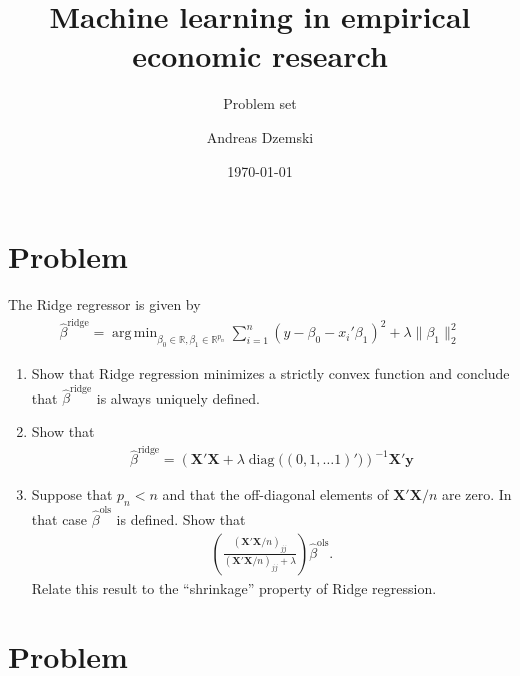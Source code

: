 \documentclass[a4paper]{scrartcl}
\title{Machine learning in empirical economic research}
\subtitle{Problem set}
\author{Andreas Dzemski}
\date{\today}
\DeclareMathOperator{\argmin}{arg\,min}
\DeclareMathOperator{\diag}{diag}
\begin{document}
\maketitle


\section*{Problem~}

The Ridge regressor is given by 
\begin{align*}
	\hat{\beta}^{\text{ridge}} = \argmin_{\beta_0 \in \mathbb{R}, \beta_1 \in \mathbb{R}^{p_n}} \sum_{i=1}^n \left(y - \beta_0 - x_i'\beta_1\right)^2 + \lambda \lVert \beta_1 \rVert_2^2 
\end{align*}
\begin{enumerate}
	\item Show that Ridge regression minimizes a strictly convex function and conclude that $\hat{\beta}^{\text{ridge}}$ is always uniquely defined.
	\item Show that 
	\begin{align*}
		\hat{\beta}^{\text{ridge}} = \left(\mathbf{X}'\mathbf{X} + \lambda \diag\big((0, 1, \dotsc 1)'\big) \right)^{-1} \mathbf{X}' \mathbf{y}
	\end{align*}
	\item Suppose that $p_n < n$ and that the off-diagonal elements of $\mathbf{X}'\mathbf{X}/n$ are zero. In that case $\hat{\beta}^{\text{ols}}$ is defined. Show that 
	\begin{align*}
		\left( \frac{(\mathbf{X}'\mathbf{X}/n)_{jj}}{(\mathbf{X}'\mathbf{X}/n)_{jj} + \lambda} \right) \hat{\beta}^{\text{ols}}.
	\end{align*}
	Relate this result to the ``shrinkage'' property of Ridge regression.
\end{enumerate}

\section*{Problem~}
\end{document}

